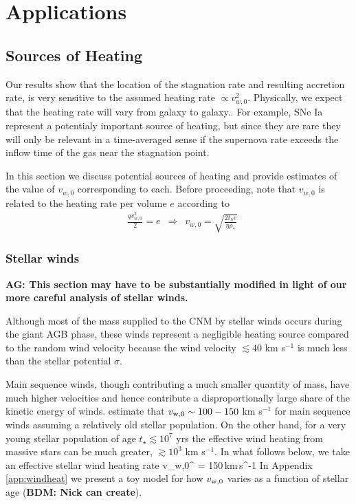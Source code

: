\documentclass[usenatbib,fleqn]{mn2e}
\newcommand{\rhostar}{\rho_*}
\newcommand{\vwO}{v_{w,0}}
\begin{document}
\section{Applications}
\label{sec:applications}
\subsection{Sources of Heating}
\label{sec:heating}

Our results show that the location of the stagnation rate and resulting accretion rate, is very sensitive to the assumed heating
rate $\propto v_{w,0}^{2}$.  Physically, we expect that the heating rate will vary from galaxy to galaxy.. For example, SNe Ia represent a
potentialy important source of heating, but since they are rare they
will only be relevant in a time-averaged sense if the supernova rate
exceeds the inflow time of the gas near the stagnation point.

In this section we discuss potential sources of heating and provide estimates of the value of $\vwO$ corresponding to each.  Before proceeding, note that $\vwO$ is related to the heating rate per volume $e$ according to 
\begin{align}
  &\frac{q \vwO^2}{2}=e \,\,\,\Rightarrow\,\,\,\vwO = \sqrt{\frac{2 t_h e}{\eta \rhostar}}
  \label{eq:vw_eff}
\end{align}

\subsubsection{Stellar winds} 
{\bf AG: This section may have to be substantially modified in light
  of our more careful analysis of stellar winds.}

Although most of the mass supplied to the CNM by stellar winds occurs
during the giant AGB phase, these winds represent a negligible heating
source compared to the random wind velocity because the wind velocity
$\lesssim 40$ km s$^{-1}$ is much less than the stellar potential
$\sigma$.

Main sequence winds, though contributing a much smaller quantity of
mass, have much higher velocities and hence contribute a
disproportionally large share of the kinetic energy of winds.
\citet{NaimanSoares-Furtado+:2013a} estimate that $v_{\rm w,0} \sim
100-150$ km s$^{-1}$ for main sequence winds assuming a relatively old
stellar population.  On the other hand, for a very young stellar
population of age $t_{\star} \lesssim 10^{7}$ yrs the effective wind
heating from massive stars can be much greater, $\gtrsim 10^{3}$ km
s$^{-1}$.  In what follows below, we take an effective stellar wind
heating rate \be v_{\rm w,0}^{\star} = 150\,{\rm km\,s^{-1}} \ee In
Appendix \ref{app:windheat} we present a toy model for how $v_{\rm
  w,0}$ varies as a function of stellar age ({\bf BDM: Nick can
  create}).
\end{document}
